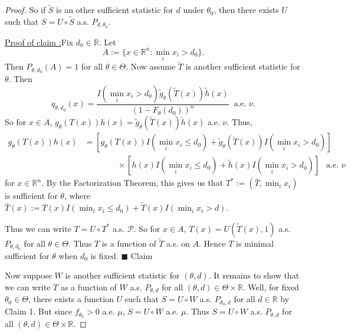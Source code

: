 \documentclass[12pt]{article}
\newcounter{ProofCounter}
\newcounter{ClaimCounter}[ProofCounter]
\newenvironment{claim}[1]{\vspace{1mm}\stepcounter{ClaimCounter}\par\noindent\underline{\bf Claim \theClaimCounter:}\space#1}{}
\newenvironment{claimproof}[1]{\par\noindent\underline{Proof of claim \theClaimCounter:}\space#1}{\hfill $\blacksquare$ Claim \theClaimCounter}
\begin{document}
\begin{enumerate}[label=(\alph*)]
\begin{proof}
      \vspace{5mm}

      So if $\tilde{S}$ is an other sufficient statistic for $d$ under $\theta_0$, then there exists $U$ such that $S = U\circ \tilde{S}$ a.s. $P_{d,\theta_0}$.


      \begin{claimproof}
        Fix $d_0 \in \mathbb{R}$. Let 
        \[ 
          A := \{x \in \mathbb{R}^{n} : \min_{i} x_{i} > d_0\}.
        \]
        Then $P_{\theta, d_0}(A) = 1$ for all $\theta \in \Theta$. Now assume $\tilde{T}$ is another sufficient statistic for $\theta$.
        Then 
        \[ 
          q_{\theta, d_0}(x) = \frac{I(\min_i x_i > d_0)\tilde{g}_{\theta}(\tilde{T}(x)) \tilde{h}(x)}{(1 - F_{\theta}(d_0))^{n}}  \ \text{ a.e. }\nu. 
        \]
        So for $x \in A$, $g_{\theta}(T(x))h(x) = \tilde{g}_{\theta}(\tilde{T}(x))\tilde{h}(x)$ a.e. $\nu$. Thus,
        \begin{align*}
          g_{\theta}(T(x))h(x) & = [g_{\theta}(T(x))I(\min_i x_i \leq d_0) + \tilde{g}_{\theta}(\tilde{T}(x))I(\min_i x_i > d_0)] \\
          & \qquad \qquad \times [h(x)I(\min_i x_i \leq d_0) + \tilde{h}(x)I(\min_i x_i > d_0)] \ \ \text{ a.e. }\nu 
        \end{align*}
        for $x \in \mathbb{R}^{n}$. By the Factorization Theorem, this gives us that $T^{*} := (\bar{T}, \min_i x_i)$ is sufficient for $\theta$, where 
        $\bar{T}(x) := T(x)I(\min_i x_i \leq d_0) + \tilde{T}(x)I(\min_i x_i > d)$.
        
        Thus we can write $T = U\circ T^{*}$ a.s. $\mathcal{P}$. So for $x \in A$, $T(x) = U(\tilde{T}(x), 1)$ a.s. $P_{\theta, d_0}$
        for all $\theta \in \Theta$. Thus $T$ is a function of $\tilde{T}$ a.s. on $A$. Hence $T$ is minimal sufficient for $\theta$ when $d_0$ is
        fixed.
      \end{claimproof}

      \vspace{5mm}

      Now suppose $W$ is another sufficient statistic for $(\theta, d)$. It remains to show that we can write $T$ as a function of $W$ a.s.
      $P_{\theta, d}$ for all $(\theta, d) \in \Theta\times \mathbb{R}$. Well, for fixed $\theta_0 \in \Theta$, there exists a function $U$ such that
      $S = U\circ W$ a.s. $P_{\theta_0, d}$ for all $d \in \mathbb{R}$ by Claim 1. But since $f_{\theta_0} > 0$ a.e. $\mu$, $S = U\circ W$ a.e. $\mu$.
      Thus $S = U\circ W$ a.s. $P_{\theta, d}$ for all $(\theta, d) \in \Theta \times \mathbb{R}$. 


\end{proof}
\end{enumerate}
\end{document}
